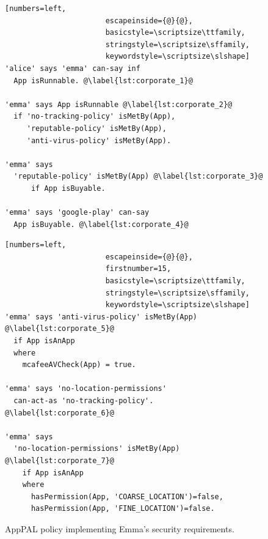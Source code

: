\documentclass[]{llncs}
\begin{document}
\begin{figure}
  \begin{minipage}[t]{0.44\textwidth}
    \begin{lstlisting}[numbers=left,
                       escapeinside={@}{@},
                       basicstyle=\scriptsize\ttfamily,
                       stringstyle=\scriptsize\sffamily,
                       keywordstyle=\scriptsize\slshape]
'alice' says 'emma' can-say inf
  App isRunnable. @\label{lst:corporate_1}@

'emma' says App isRunnable @\label{lst:corporate_2}@
  if 'no-tracking-policy' isMetBy(App),
     'reputable-policy' isMetBy(App),
     'anti-virus-policy' isMetBy(App).

'emma' says
  'reputable-policy' isMetBy(App) @\label{lst:corporate_3}@
      if App isBuyable.

'emma' says 'google-play' can-say
  App isBuyable. @\label{lst:corporate_4}@
    \end{lstlisting}
  \end{minipage}\begin{minipage}[t]{0.56\textwidth}
    \begin{lstlisting}[numbers=left,
                       escapeinside={@}{@},
                       firstnumber=15,
                       basicstyle=\scriptsize\ttfamily,
                       stringstyle=\scriptsize\sffamily,
                       keywordstyle=\scriptsize\slshape]
'emma' says 'anti-virus-policy' isMetBy(App) @\label{lst:corporate_5}@
  if App isAnApp
  where
    mcafeeAVCheck(App) = true.

'emma' says 'no-location-permissions'
  can-act-as 'no-tracking-policy'. @\label{lst:corporate_6}@

'emma' says
  'no-location-permissions' isMetBy(App) @\label{lst:corporate_7}@
    if App isAnApp
    where
      hasPermission(App, 'COARSE_LOCATION')=false,
      hasPermission(App, 'FINE_LOCATION')=false.
\end{lstlisting}
\end{minipage}
\caption{AppPAL policy implementing Emma's security requirements.}
\label{lst:corporate}
\end{figure}
\end{document}
